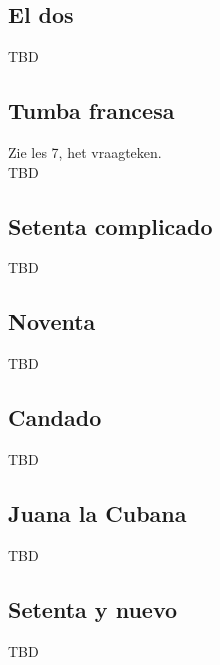 \subsection{El dos}
TBD

\subsection{Tumba francesa}
Zie les 7, het vraagteken.\\
TBD

\subsection{Setenta complicado}
TBD

\subsection{Noventa}
TBD

\subsection{Candado}
TBD

\subsection{Juana la Cubana}
TBD

\subsection{Setenta y nuevo}
TBD

